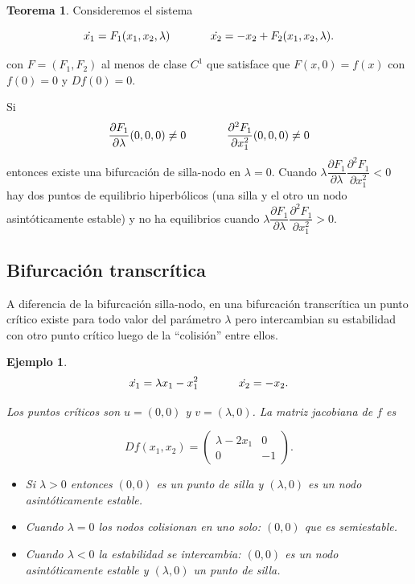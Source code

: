 \documentclass[11pt]{book}
\theoremstyle{definition}
\numberwithin{definition}{section}
\theoremstyle{theorem}
\newtheorem{theorem}{Teorema}
\numberwithin{theorem}{section}
\numberwithin{lemma}{section}
\numberwithin{corollary}{section}
\theoremstyle{plain}
\newtheorem{example}{Ejemplo}
\numberwithin{example}{section}
\begin{document}
\begin{theorem}Consideremos el sistema

$$ \dot{x_1} = F_1(x_1, x_2, \lambda) \hspace{0.5in} \dot{x_2} = -x_2 + F_2(x_1, x_2, \lambda). $$

con $F=(F_1,F_2)$ al menos de clase $C^1$ que satisface que $F(x,0) = f(x)$ con $f(0) = 0$ y $Df(0) = 0$.

Si
$$
	\dfrac{\partial F_1}{\partial \lambda}(0,0,0) \neq 0 \hspace{0.5in}
	\dfrac{\partial^2 F_1}{\partial x_1^2}(0,0,0) \neq 0	
$$
entonces existe una bifurcación de silla-nodo en $\lambda = 0$.
Cuando $\lambda \dfrac{\partial F_1}{\partial \lambda} \dfrac{\partial^2 F_1}{\partial x_1^2} < 0$ hay dos puntos de equilibrio hiperbólicos (una silla y el otro un nodo asintóticamente estable) y no ha equilibrios cuando $\lambda \dfrac{\partial F_1}{\partial \lambda} \dfrac{\partial^2 F_1}{\partial x_1^2} > 0$.
\end{theorem}


\subsection{Bifurcación transcrítica}

A diferencia de la bifurcación silla-nodo, en una bifurcación transcrítica un punto crítico existe para todo valor del parámetro $\lambda$ pero intercambian su estabilidad con otro punto crítico luego de la ``colisión'' entre ellos.

\begin{example}
$$ 
	\dot{x_1} = \lambda x_1 - x_1^2 \hspace{0.5in} \dot{x_2} = -x_2.
$$

Los puntos críticos son $u = (0, 0)$ y $v = (\lambda, 0)$.
La matriz jacobiana de $f$ es

$$ Df(x_1,x_2) = \left( \begin{array}{ll}
	\lambda - 2x_1 & 0 \\
	0 & -1
\end{array} \right). $$

\begin{itemize}
	\item Si $\lambda > 0$ entonces $(0,0)$ es un punto de silla y $(\lambda, 0)$ es un nodo asintóticamente estable.
	\item Cuando $\lambda = 0$ los nodos colisionan en uno solo: $(0,0)$ que es semiestable.
	\item Cuando $\lambda < 0$ la estabilidad se intercambia: $(0,0)$ es un nodo asintóticamente estable y $(\lambda, 0)$ un punto de silla.
\end{itemize}

\end{example}
\end{document}
